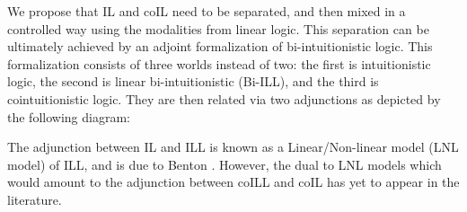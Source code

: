 \documentclass{lmcs}
\begin{document}
We propose that IL and coIL need to be separated, and then mixed in a
controlled way using the modalities from linear logic.  This
separation can be ultimately achieved by an adjoint formalization of
bi-intuitionistic logic.  This formalization consists of three worlds
instead of two: the first is intuitionistic logic, the second is
linear bi-intuitionistic (Bi-ILL), and the third is cointuitionistic
logic.  They are then related via two adjunctions as depicted by the
following diagram:
\begin{center}
\end{center}
The adjunction between IL and ILL is known as a Linear/Non-linear model
(LNL model) of ILL, and is due to Benton \cite{Benton:1994}.  However,
the dual to LNL models which would amount to the adjunction between coILL
and coIL has yet to appear in the literature.
\end{document}
